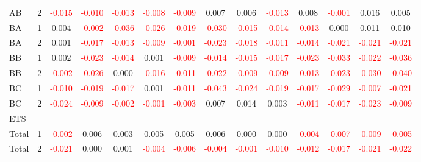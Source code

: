\begin{table}[H]
{\begin{tabular}{llcccccccccccc}
AB & 2 & \textcolor{red}{-0.015} & \textcolor{red}{-0.010} & \textcolor{red}{-0.013} & \textcolor{red}{-0.008} & \textcolor{red}{-0.009} & 0.007 & 0.006 & \textcolor{red}{-0.013} & 0.008 & \textcolor{red}{-0.001} & 0.016 & 0.005\\
BA & 1 & 0.004 & \textcolor{red}{-0.002} & \textcolor{red}{-0.036} & \textcolor{red}{-0.026} & \textcolor{red}{-0.019} & \textcolor{red}{-0.030} & \textcolor{red}{-0.015} & \textcolor{red}{-0.014} & \textcolor{red}{-0.013} & 0.000 & 0.011 & 0.010\\
BA & 2 & 0.001 & \textcolor{red}{-0.017} & \textcolor{red}{-0.013} & \textcolor{red}{-0.009} & \textcolor{red}{-0.001} & \textcolor{red}{-0.023} & \textcolor{red}{-0.018} & \textcolor{red}{-0.011} & \textcolor{red}{-0.014} & \textcolor{red}{-0.021} & \textcolor{red}{-0.021} & \textcolor{red}{-0.021}\\
BB & 1 & 0.002 & \textcolor{red}{-0.023} & \textcolor{red}{-0.014} & 0.001 & \textcolor{red}{-0.009} & \textcolor{red}{-0.014} & \textcolor{red}{-0.015} & \textcolor{red}{-0.017} & \textcolor{red}{-0.023} & \textcolor{red}{-0.033} & \textcolor{red}{-0.022} & \textcolor{red}{-0.036}\\
BB & 2 & \textcolor{red}{-0.002} & \textcolor{red}{-0.026} & 0.000 & \textcolor{red}{-0.016} & \textcolor{red}{-0.011} & \textcolor{red}{-0.022} & \textcolor{red}{-0.009} & \textcolor{red}{-0.009} & \textcolor{red}{-0.013} & \textcolor{red}{-0.023} & \textcolor{red}{-0.030} & \textcolor{red}{-0.040}\\
BC & 1 & \textcolor{red}{-0.010} & \textcolor{red}{-0.019} & \textcolor{red}{-0.017} & 0.001 & \textcolor{red}{-0.011} & \textcolor{red}{-0.043} & \textcolor{red}{-0.024} & \textcolor{red}{-0.019} & \textcolor{red}{-0.017} & \textcolor{red}{-0.029} & \textcolor{red}{-0.007} & \textcolor{red}{-0.021}\\
BC & 2 & \textcolor{red}{-0.024} & \textcolor{red}{-0.009} & \textcolor{red}{-0.002} & \textcolor{red}{-0.001} & \textcolor{red}{-0.003} & 0.007 & 0.014 & 0.003 & \textcolor{red}{-0.011} & \textcolor{red}{-0.017} & \textcolor{red}{-0.023} & \textcolor{red}{-0.009}\\
\hline
ETS &  &  &  &  &  &  &  &  &  &  &  &  & \\
\hline
Total & 1 & \textcolor{red}{-0.002} & 0.006 & 0.003 & 0.005 & 0.005 & 0.006 & 0.000 & 0.000 & \textcolor{red}{-0.004} & \textcolor{red}{-0.007} & \textcolor{red}{-0.009} & \textcolor{red}{-0.005}\\
Total & 2 & \textcolor{red}{-0.021} & 0.000 & 0.001 & \textcolor{red}{-0.004} & \textcolor{red}{-0.006} & \textcolor{red}{-0.004} & \textcolor{red}{-0.001} & \textcolor{red}{-0.010} & \textcolor{red}{-0.012} & \textcolor{red}{-0.017} & \textcolor{red}{-0.021} & \textcolor{red}{-0.022}\\

\end{tabular}}
\end{table}
